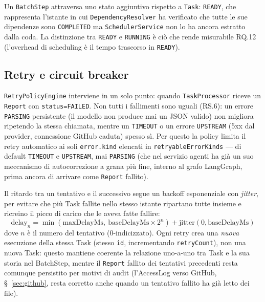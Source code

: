 \documentclass[11pt,a4paper]{article}
\begin{document}
Un \texttt{BatchStep} attraversa uno stato aggiuntivo rispetto a \texttt{Task}: \texttt{READY}, che rappresenta l'istante in cui \texttt{DependencyResolver} ha verificato che tutte le sue dipendenze sono \texttt{COMPLETED} ma \texttt{SchedulerService} non lo ha ancora estratto dalla coda. La distinzione tra \texttt{READY} e \texttt{RUNNING} è ciò che rende misurabile RQ.12 (l'overhead di scheduling è il tempo trascorso in \texttt{READY}).

\subsection{Retry e circuit breaker}

\texttt{RetryPolicyEngine} interviene in un solo punto: quando \texttt{TaskProcessor} riceve un \texttt{Report} con \texttt{status=FAILED}. Non tutti i fallimenti sono uguali (RS.6): un errore \texttt{PARSING} persistente (il modello non produce mai un JSON valido) non migliora ripetendo la stessa chiamata, mentre un \texttt{TIMEOUT} o un errore \texttt{UPSTREAM} (5xx dal provider, connessione GitHub caduta) spesso sì. Per questo la policy limita il retry automatico ai soli \texttt{error.kind} elencati in \texttt{retryableErrorKinds} --- di default \texttt{TIMEOUT} e \texttt{UPSTREAM}, mai \texttt{PARSING} (che nel servizio agenti ha già un suo meccanismo di autocorrezione a grana più fine, interno al grafo LangGraph, prima ancora di arrivare come \texttt{Report} fallito).

Il ritardo tra un tentativo e il successivo segue un backoff esponenziale con \emph{jitter}, per evitare che più Task fallite nello stesso istante ripartano tutte insieme e ricreino il picco di carico che le aveva fatte fallire:
$$\text{delay}_n = \min(\text{maxDelayMs},\ \text{baseDelayMs} \times 2^{n}) + \text{jitter}(0, \text{baseDelayMs})$$
dove $n$ è il numero del tentativo (0-indicizzato). Ogni retry crea una \emph{nuova} esecuzione della stessa Task (stesso \texttt{id}, incrementando \texttt{retryCount}), non una nuova Task: questo mantiene coerente la relazione uno-a-uno tra Task e la sua storia nel BatchStep, mentre il \texttt{Report} fallito dei tentativi precedenti resta comunque persistito per motivi di audit (l'AccessLog verso GitHub, \S~\ref{sec:github}, resta corretto anche quando un tentativo fallito ha già letto dei file).
\end{document}
